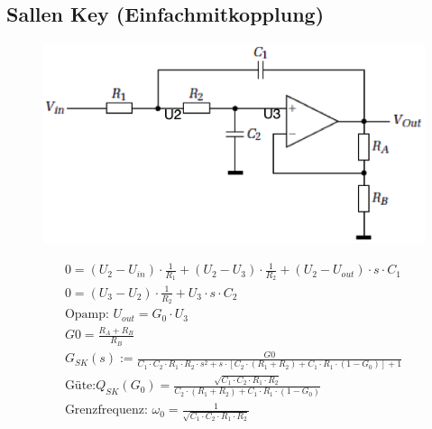 \subsection{Sallen Key (Einfachmitkopplung)}
\begin{figure}[htb]
\centering
 \includegraphics[scale=0.4]{pictures/sallenkey}
\end{figure}
\begin{gather}
0=(U_2-U_{in})\cdot \frac{1}{R_1}+(U_2-U_3)\cdot \frac{1}{R_2}+(U_2-U_{out})\cdot s\cdot C_1\\
0=(U_3-U_2)\cdot \frac{1}{R_2}+U_3\cdot s\cdot C_2\\
\text{Opamp: }U_{out}=G_0\cdot U_3\\
G0=\frac{R_{A}+R_{B}}{R_{B}}\\
G_{SK}(s):=\frac{G0}{C_1\cdot C_2\cdot R_1\cdot R_2\cdot s^2+s\cdot [C_2\cdot
(R_1+R_2)+C_1\cdot R_1\cdot (1-G_0)]+1}\\
\text{Güte:
}Q_{SK}(G_0)=\frac{\sqrt{C_1\cdot C_2\cdot R_1\cdot R_2}}{C_2\cdot (R_1+R_2)+C_1\cdot R_1\cdot (1-G_0)}\\
\text{Grenzfrequenz: }\omega_0=\frac{1}{\sqrt{C_1\cdot C_2\cdot R_1\cdot R_2}}
\end{gather}
